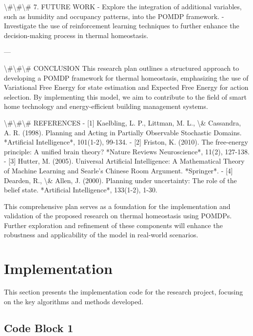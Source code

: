 \documentclass[11pt,a4paper]{article}
\begin{document}
\textbackslash{}#\textbackslash{}#\textbackslash{}# 7. FUTURE WORK
- Explore the integration of additional variables, such as humidity and occupancy patterns, into the POMDP framework.
- Investigate the use of reinforcement learning techniques to further enhance the decision-making process in thermal homeostasis.

---

\textbackslash{}#\textbackslash{}#\textbackslash{}# CONCLUSION
This research plan outlines a structured approach to developing a POMDP framework for thermal homeostasis, emphasizing the use of Variational Free Energy for state estimation and Expected Free Energy for action selection. By implementing this model, we aim to contribute to the field of smart home technology and energy-efficient building management systems.

\textbackslash{}#\textbackslash{}#\textbackslash{}# REFERENCES
- [1] Kaelbling, L. P., Littman, M. L., \textbackslash{}& Cassandra, A. R. (1998). Planning and Acting in Partially Observable Stochastic Domains. *Artificial Intelligence*, 101(1-2), 99-134.
- [2] Friston, K. (2010). The free-energy principle: A unified brain theory? *Nature Reviews Neuroscience*, 11(2), 127-138.
- [3] Hutter, M. (2005). Universal Artificial Intelligence: A Mathematical Theory of Machine Learning and Searle's Chinese Room Argument. *Springer*.
- [4] Dearden, R., \textbackslash{}& Allen, J. (2000). Planning under uncertainty: The role of the belief state. *Artificial Intelligence*, 133(1-2), 1-30.

This comprehensive plan serves as a foundation for the implementation and validation of the proposed research on thermal homeostasis using POMDPs. Further exploration and refinement of these components will enhance the robustness and applicability of the model in real-world scenarios.
\section{Implementation}

This section presents the implementation code for the research project, focusing on the key algorithms and methods developed.


\subsection{Code Block 1}
\end{document}
